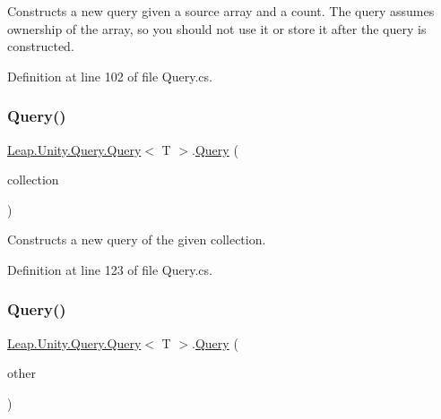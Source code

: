 Constructs a new query given a source array and a count. The query assumes ownership of the array, so you should not use it or store it after the query is constructed. 



Definition at line 102 of file Query.\+cs.

\mbox{\label{struct_leap_1_1_unity_1_1_query_1_1_query_a38ad1df9355f871cde35fe9ca7c72da0}} 
\subsubsection{\texorpdfstring{Query()}{Query()}\hspace{0.1cm}{\footnotesize\ttfamily [2/3]}}
{\footnotesize\ttfamily \mbox{\hyperlink{struct_leap_1_1_unity_1_1_query_1_1_query}{Leap.\+Unity.\+Query.\+Query}}$<$ T $>$.\mbox{\hyperlink{struct_leap_1_1_unity_1_1_query_1_1_query}{Query}} (\begin{DoxyParamCaption}\item[{I\+Collection$<$ T $>$}]{collection }\end{DoxyParamCaption})}



Constructs a new query of the given collection. 



Definition at line 123 of file Query.\+cs.

\mbox{\label{struct_leap_1_1_unity_1_1_query_1_1_query_a023addd104eccd2f92b37e67eb84208f}} 
\subsubsection{\texorpdfstring{Query()}{Query()}\hspace{0.1cm}{\footnotesize\ttfamily [3/3]}}
{\footnotesize\ttfamily \mbox{\hyperlink{struct_leap_1_1_unity_1_1_query_1_1_query}{Leap.\+Unity.\+Query.\+Query}}$<$ T $>$.\mbox{\hyperlink{struct_leap_1_1_unity_1_1_query_1_1_query}{Query}} (\begin{DoxyParamCaption}\item[{\mbox{\hyperlink{struct_leap_1_1_unity_1_1_query_1_1_query}{Query}}$<$ T $>$}]{other }\end{DoxyParamCaption})}



